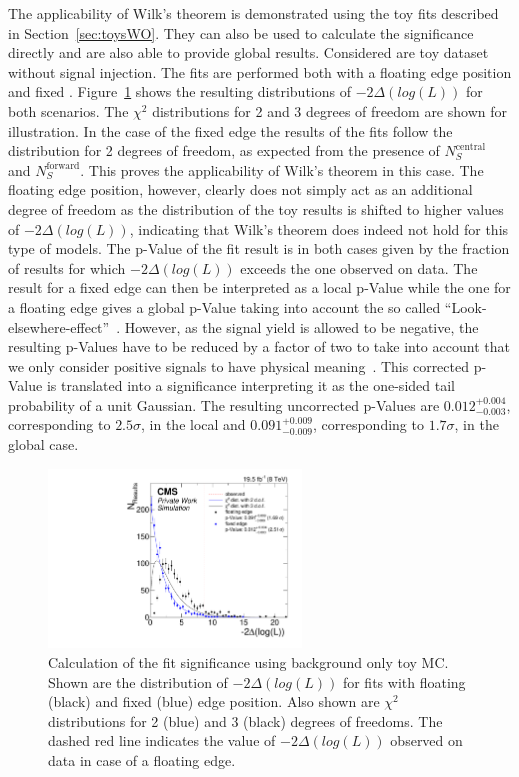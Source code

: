 The applicability of Wilk's theorem is demonstrated using the toy fits described in Section~\ref{sec:toysWO}. They can also be used to calculate the significance directly and are also able to provide global results.
Considered are toy dataset without signal injection. The fits are performed both with a floating edge position and fixed \mlledge. Figure~\ref{fig:fit:toySignif} shows the resulting distributions of $-2\Delta(log(L))$ for both scenarios. The $\chi^2$ distributions for 2 and 3 degrees of freedom are shown for illustration. In the case of the fixed edge the results of the fits follow the distribution for 2 degrees of freedom, as expected from the presence of $N_{S}^{\text{central}}$ and $N_{S}^{\text{forward}}$. This proves the applicability of Wilk's theorem in this case. The floating edge position, however, clearly does not simply act as an additional degree of freedom as the distribution of the toy results is shifted to higher values of $-2\Delta(log(L))$, indicating that Wilk's theorem does indeed not hold for this type of models.
The p-Value of the fit result is in both cases given by the fraction of results for which $-2\Delta(log(L))$ exceeds the one observed on data. The result for a fixed edge can then be interpreted as a local p-Value while the one for a floating edge gives a global p-Value taking into account the so called ``Look-elsewhere-effect''~\cite{GrossVittels}. However, as the signal yield is allowed to be negative, the resulting p-Values have to be reduced by a factor of two to take into account that we only consider positive signals to have physical meaning~\cite{GrossVittels}. This corrected p-Value is translated into a significance interpreting it as the one-sided tail probability of a unit Gaussian. The resulting uncorrected p-Values are $0.012^{+0.004}_{-0.003}$, corresponding to $2.5\sigma$, in the local and $0.091^{+0.009}_{-0.009}$, corresponding to $1.7\sigma$, in the global case.

\begin{figure}[htbp]
\centering
  \includegraphics[width=0.6\textwidth]{plots/results/fit/toyResults/significanceStudy_BackgroundOnly.pdf}
\caption{Calculation of the fit significance using background only toy MC. Shown are the distribution of $-2\Delta(log(L))$ for fits with floating (black) and fixed (blue) edge position. Also shown are $\chi^2$ distributions for 2 (blue) and 3 (black) degrees of freedoms. The dashed red line indicates the value of $-2\Delta(log(L))$ observed on data in case of a floating edge.}
\label{fig:fit:toySignif}
\end{figure}

